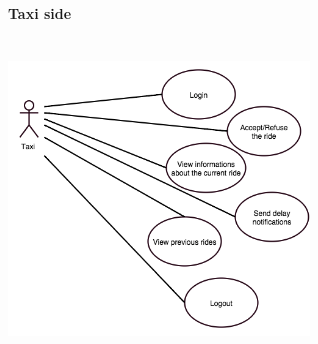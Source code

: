 \paragraph{Taxi side}
	\begin{center}
	~\\
\includegraphics[width=0.60\textwidth]{./images/UseCaseTaxi.png}~
	\end{center}

